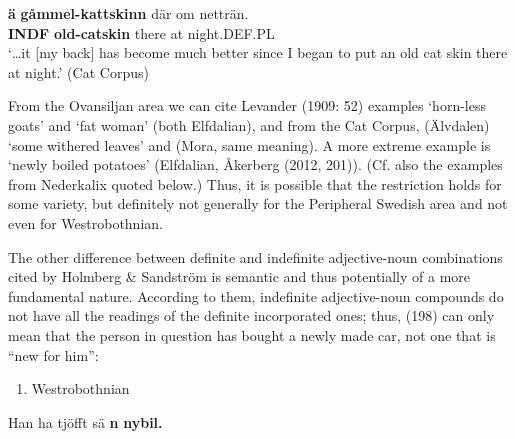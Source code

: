 \ea\label{}
\gll \textbf{ä}\textbf{  gåmmel-kattskinn} där  om  netträn.\\


\textbf{INDF} \textbf{old-catskin} there  at   night.DEF.PL\\ %


‘…it [my back] has become much better since I began to put an old cat skin there at night.’ (Cat Corpus) 
\z


From the Ovansiljan area we can cite Levander (1909: 52) examples  ‘horn-less goats’ and  ‘fat woman’ (both Elfdalian), and from the Cat Corpus,  (Älvdalen) ‘some withered leaves’ and (Mora, same meaning). A more extreme example is \textbf{ }‘newly boiled potatoes’ (Elfdalian, Åkerberg (2012, 201)). (Cf. also the examples from Nederkalix quoted below.) Thus, it is possible that the restriction holds for some variety, but definitely not generally for the Peripheral Swedish area and not even for Westrobothnian. 

The other difference between definite and indefinite adjective-noun combinations cited by Holmberg \& Sandström is semantic and thus potentially of a more fundamental nature. According to them, indefinite adjective-noun compounds do not have all the readings of the definite incorporated ones; thus, (198) can only mean that the person in question has bought a newly made car, not one that is “new for him”:

\begin{enumerate} %
\item 
\label{bkm:Ref154565993}Westrobothnian

\end{enumerate} %
\ea\label{}
\gll Han  ha  tjöfft  sä  \textbf{n}\textbf{  nybil.}\\


